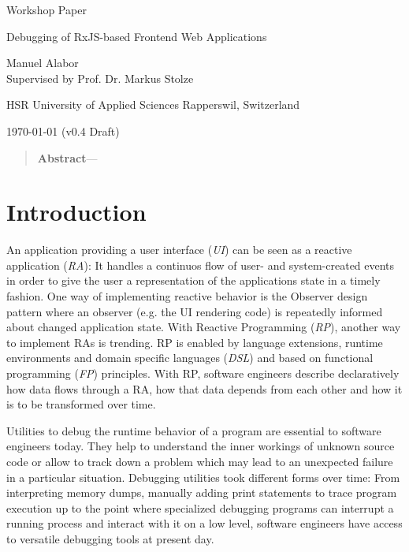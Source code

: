 \documentclass[12pt,a4paper]{article}
\newcommand{\version}{v0.4 Draft}
\begin{document}
\begin{centering}

	\Large{Workshop Paper}
	\par
	\Huge{Debugging of RxJS-based Frontend Web Applications}
	\par
	\vspace{2ex}

	\normalsize{
		Manuel Alabor\\
		Supervised by Prof. Dr. Markus Stolze\\
		\par
		\vspace{2ex}
		HSR University of Applied Sciences Rapperswil, Switzerland\\
		\par
		\vspace{2ex}
		\today{} (\version)
	}
	\par
	\vspace{2ex}

	\begin{quotation}
		\small{
			\noindent\textbf{Abstract}---
		}
		\par
		\vspace{4ex}
	\end{quotation}
\end{centering}

\section{Introduction}

An application providing a user interface (\emph{UI}) can be seen as a reactive application (\emph{RA})\cite{7827078}: It handles a continuos flow of user- and system-created events in order to give the user a representation of the applications state in a timely fashion. One way of implementing reactive behavior is the Observer design pattern\cite{gamma1995design} where an observer (e.g. the UI rendering code) is repeatedly informed about changed application state. With Reactive Programming (\emph{RP}), another way to implement RAs is trending. RP is enabled by language extensions, runtime environments and domain specific languages (\emph{DSL}) and based on functional programming (\emph{FP}) principles. With RP, software engineers describe declaratively how data flows through a RA, how that data depends from each other and how it is to be transformed over time.

Utilities to debug the runtime behavior of a program are essential to software engineers today. They help to understand the inner workings of unknown source code or allow to track down a problem which may lead to an unexpected failure in a particular situation. Debugging utilities took different forms over time: From interpreting memory dumps, manually adding print statements to trace program execution up to the point where specialized debugging programs can interrupt a running process and interact with it on a low level, software engineers have access to versatile debugging tools at present day.
\end{document}

